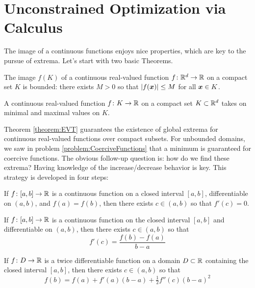 
\chapter{Unconstrained Optimization via Calculus}


The image of a continuous functions enjoys nice properties, which are key to the pursue of extrema.  Let's start with two basic Theorems.

\begin{theorem}\label{theorem:BVT}
The image $f(K)$ of a continuous real-valued function $f \colon \mathbb{R}^d \to \mathbb{R}$ on a compact set $K$ is bounded: there exists $M>0$ so that $\lvert  f(\boldsymbol{x})  \rvert \leq M$ for all $\boldsymbol{x} \in K$.
\end{theorem}

\begin{theorem}\label{theorem:EVT}
A continuous real-valued function $f \colon K \to \mathbb{R}$ on a compact set $K \subset \mathbb{R}^d$ takes on minimal and maximal values on $K$.
\end{theorem}

Theorem \ref{theorem:EVT} guarantees the existence of global extrema for continuous real-valued functions over compact subsets.  For unbounded domains, we saw in problem \ref{problem:CoerciveFunctions} that a minimum is guaranteed for coercive functions.  The obvious follow-up question is: how do we find these extrema?  Having knowledge of the  increase/decrease behavior is key.  This strategy is developed in four steps:

\begin{theorem}\label{theorem:Rolle}
If $f\colon [a,b] \to \mathbb{R}$ is a continuous function on a closed interval $[a,b]$, differentiable on $(a,b)$, and $f(a) = f(b)$, then there exists $c \in (a,b)$ so that $f'(c)=0$.
\end{theorem}

\begin{theorem}\label{theorem:MVT}
If $f\colon [a,b] \to \mathbb{R}$ is a continuous function on the closed interval $[a,b]$ and differentiable on $(a,b)$, then there exists $c \in (a,b)$ so that
\begin{equation*}
f'(c) = \frac{f(b)-f(a)}{b-a}
\end{equation*}
\end{theorem}

\begin{theorem}\label{theorem:ELM}
If $f\colon D \to \mathbb{R}$ is a twice differentiable function on a domain $D \subset \mathbb{R}$ containing the closed interval $[a,b]$, then there exists $c \in (a,b)$ so that 
\begin{equation*}
f(b) = f(a) + f'(a)(b-a) + \tfrac{1}{2}f''(c)(b-a)^2
\end{equation*}
\end{theorem}

